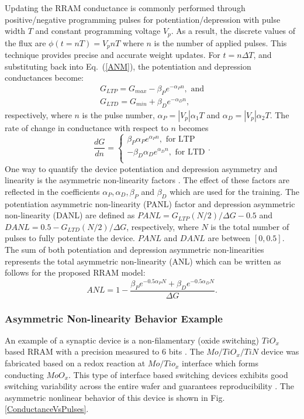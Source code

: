 \documentclass[english]{article}
\renewcommand{\refeq}[1]{{Eq.~(\ref{#1})}}
\renewcommand{\cite}{\citep}
\begin{document}
Updating the RRAM conductance is commonly performed through positive/negative programming pulses for potentiation/depression with pulse width $T$ and constant programming voltage $V_p$. 
As a result, the discrete values of the flux are $\phi(t=nT)=V_p n T$ where $n$ is the number of applied pulses. This technique provides precise and accurate weight updates. For $t=n\Delta T$, and substituting back into \refeq{ANM}, the potentiation and depression conductances become:
%
\begin{eqnarray}
G_{LTP}=G_{max}-\beta_P e^{-\alpha_P n},\,\, \text{and}\\
G_{LTD}=G_{min}+\beta_D e^{-\alpha_D n},
\end{eqnarray}
%
\noindent respectively, where $n$ is the pulse number, $\alpha_P=|V_p|\alpha_1 T$ and $\alpha_D=|V_p| \alpha_2T$. 
The rate of change in conductance with respect to $n$ becomes
\begin{equation}
\frac{dG}{dn}= \left\{ \begin{matrix}
\beta_P \alpha_P  e^{\alpha_P n} ,\text{ for LTP}\\
-\beta_D \alpha_D  e^{\alpha_D n} ,\text{ for LTD}\\
\end{matrix} .
\right.
\end{equation}
%
One way to quantify the device potentiation and depression asymmetry and linearity is the asymmetric non-linearity factors \cite{woo2018resistive}.
The effect of these factors are reflected in the coefficients $\alpha_P, \alpha_D, \beta_P$ and $\beta_D$ which are used for the training. 
The potentiation asymmetric non-linearity (PANL) factor and depression asymmetric non-linearity (DANL) are defined as
$PANL={G_{LTP}\left(N/2\right)}/{\Delta G}-0.5$ and $DANL=0.5-{G_{LTD}\left(N/2\right)}/{\Delta G}$, respectively, where $N$ is the total number of pulses to fully potentiate the device. $PANL$ and $DANL$ are between $[0, 0.5]$. The sum of both potentiation and depression asymmetric non-linearities represents the total asymmetric non-linearity (ANL) which can be written as follows for the proposed RRAM model:
\begin{equation}
ANL=1-\frac{\beta_P e^{-0.5\alpha_P N}+\beta_D e^{-0.5\alpha_D N}}{\Delta G}. 
\end{equation}

\subsubsection{Asymmetric Non-linearity Behavior Example}
An example of a synaptic device is a non-filamentary (oxide switching) $TiO_x$ based RRAM with a precision measured to 6 bits \cite{park2016tio}. The $Mo/TiO_x/TiN$ device was fabricated based on a redox reaction at $Mo/Tio_x$ interface which forms conducting $MoO_x$.
This type of interface based switching devices exhibits good switching variability across the entire wafer and guarantees reproducibility \cite{park2016tio}.
The asymmetric nonlinear behavior of this device is shown in Fig. \ref{ConductanceVsPulses}. 
\end{document}
